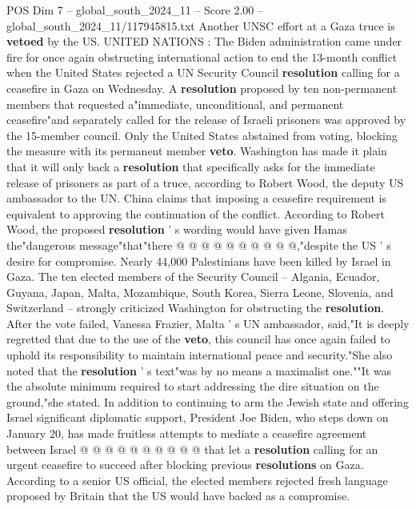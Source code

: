 \begin{textsample}{POS Dim 7 – global\_south\_2024\_11 – Score 2.00 – global\_south\_2024\_11/117945815.txt}  \label{ex:f7_pos_016}
Another UNSC effort at a Gaza truce is \textbf{vetoed} by the US.
UNITED NATIONS : The Biden administration came under fire for once again obstructing international action to end the 13-month conflict when the United States rejected a UN Security Council \textbf{resolution} calling for a ceasefire in Gaza on Wednesday.
A \textbf{resolution} proposed by ten non-permanent members that requested a"immediate, unconditional, and permanent ceasefire"and separately called for the release of Israeli prisoners was approved by the 15-member council.
Only the United States abstained from voting, blocking the measure with its permanent member \textbf{veto}.
Washington has made it plain that it will only back a \textbf{resolution} that specifically asks for the immediate release of prisoners as part of a truce, according to Robert Wood, the deputy US ambassador to the UN.
China claims that imposing a ceasefire requirement is equivalent to approving the continuation of the conflict.
According to Robert Wood, the proposed \textbf{resolution} ' s wording would have given Hamas the"dangerous message"that"there @ @ @ @ @ @ @ @ @ @,"despite the US ' s desire for compromise.
Nearly 44,000 Palestinians have been killed by Israel in Gaza.
The ten elected members of the Security Council -- Algania, Ecuador, Guyana, Japan, Malta, Mozambique, South Korea, Sierra Leone, Slovenia, and Switzerland -- strongly criticized Washington for obstructing the \textbf{resolution}.
After the vote failed, Vanessa Frazier, Malta ' s UN ambassador, said,"It is deeply regretted that due to the use of the \textbf{veto}, this council has once again failed to uphold its responsibility to maintain international peace and security."She also noted that the \textbf{resolution} ' s text"was by no means a maximalist one.""It was the absolute minimum required to start addressing the dire situation on the ground,"she stated.
In addition to continuing to arm the Jewish state and offering Israel significant diplomatic support, President Joe Biden, who steps down on January 20, has made fruitless attempts to mediate a ceasefire agreement between Israel @ @ @ @ @ @ @ @ @ @ that let a \textbf{resolution} calling for an urgent ceasefire to succeed after blocking previous \textbf{resolutions} on Gaza.
According to a senior US official, the elected members rejected fresh language proposed by Britain that the US would have backed as a compromise.

\end{textsample}
